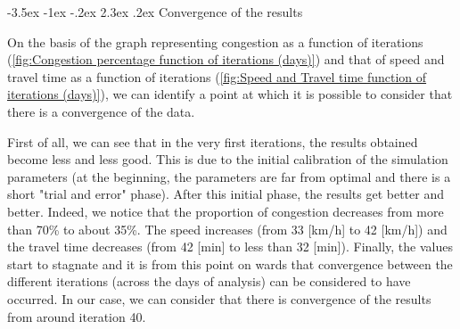 \documentclass[a4paper, 12pt,oneside]{article}
\makeatletter
\renewcommand{\subsection}{\@startsection {subsection}{1}{\z@}%
             {-3.5ex \@plus -1ex \@minus -.2ex}%
             {2.3ex \@plus.2ex}%
             {\normalfont\normalsize\bfseries}}
\makeatother
\begin{document}
\subsection{Convergence of the results}
\label{section:Convergence of the results}


On the basis of the graph representing congestion as a function of iterations (\ref{fig:Congestion percentage function of iterations (days)}) and that of speed and travel time as a function of iterations (\ref{fig:Speed and Travel time function of iterations (days)}), we can identify a point at which it is possible to consider that there is a convergence of the data.

First of all, we can see that in the very first iterations, the results obtained become less and less good. This is due to the initial calibration of the simulation parameters (at the beginning, the parameters are far from optimal and there is a short "trial and error" phase). After this initial phase, the results get better and better. Indeed, we notice that the proportion of congestion decreases from more than 70\% to about 35\%. The speed increases (from 33 [km/h] to 42 [km/h]) and the travel time decreases (from 42 [min] to less than 32 [min]). Finally, the values start to stagnate and it is from this point on wards that convergence between the different iterations (across the days of analysis) can be considered to have occurred. In our case, we can consider that there is convergence of the results from around iteration 40.
\end{document}
